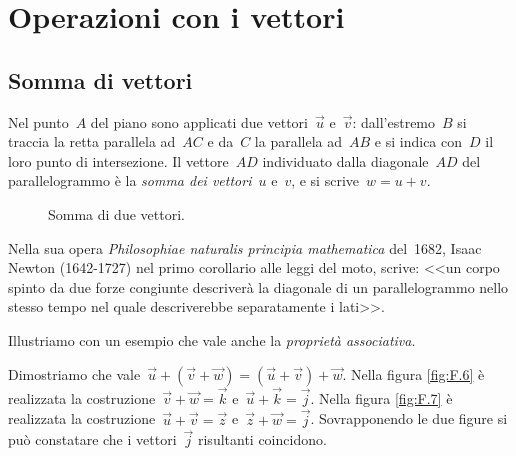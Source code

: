 
\section{Operazioni con i vettori}
\label{sec:vett_operazioni}

\subsection{Somma di vettori}
\begin{definizione}
Nel punto~$A$ del piano sono applicati due vettori~$\vec{u}$ e~$\vec{v}$: 
dall'estremo~$B$ si
traccia la retta parallela ad~$AC$ e da~$C$ la parallela ad~$AB$ e si indica 
con~$D$ il loro punto di intersezione.
Il vettore~$AD$ individuato dalla diagonale~$AD$ del parallelogrammo è la 
\emph{somma dei vettori}~$u$ e~$v$, e si scrive~$w=u+v$.
\end{definizione}


\begin{inaccessibleblock}
 \begin{figure}[h]
\centering

 \caption{Somma di due vettori.}
 \label{fig:vett_somma_parallelogramma}
\end{figure}
\end{inaccessibleblock}

Nella sua opera \emph{Philosophiae naturalis principia mathematica} del~1682, 
Isaac Newton (1642-1727) nel primo corollario alle leggi del moto,
scrive: <<un corpo spinto da due forze congiunte descriverà la diagonale di un 
parallelogrammo nello stesso tempo nel quale descriverebbe separatamente i 
lati>>.


Illustriamo con un esempio che vale anche la \emph{proprietà associativa}.

\begin{esempio}
Dimostriamo che vale~$\vec{u}+(\vec{v}+\vec{w})=(\vec{u}+\vec{v})+\vec{w}$.
Nella figura \ref{fig:F.6} è realizzata la 
costruzione~$\vec{v}+\vec{w}=\vec{k}$ e~$\vec{u}+\vec{k}=\vec{j}$.
Nella figura \ref{fig:F.7} è realizzata la 
costruzione~$\vec{u}+\vec{v}=\vec{z}$ e~$\vec{z}+\vec{w}=\vec{j}$.
Sovrapponendo le due figure si può constatare che i vettori~$\vec{j}$ 
risultanti coincidono.
\end{esempio}


